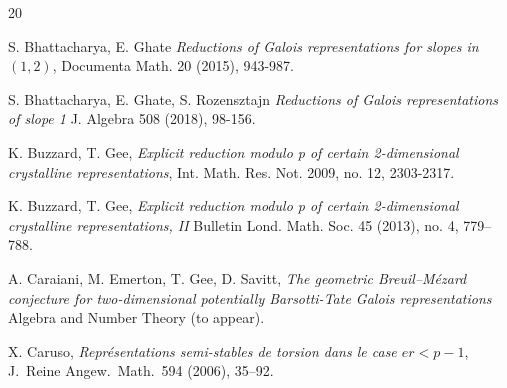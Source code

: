\documentclass[11pt]{amsart}
\theoremstyle{definition}
\numberwithin{equation}{subsection}
\theoremstyle{plain}
\theoremstyle{plain}
\theoremstyle{plain}
\theoremstyle{plain}
\theoremstyle{plain}
\theoremstyle{plain}
\theoremstyle{plain}
\theoremstyle{plain}
\theoremstyle{plain}
\theoremstyle{plain}
\theoremstyle{plain}
\theoremstyle{plain}
\theoremstyle{definition}
\theoremstyle{definition}
\theoremstyle{definition}
\theoremstyle{remark}
\renewcommand{\(}{\textup{(}}
\renewcommand{\)}{\textup{)}}
\newcommand{\Q}{\mathbf{Q}}
\begin{document}
\begin{thebibliography}{20}




 S. Bhattacharya, E. Ghate \emph{Reductions of Galois representations for slopes in $(1,2)$}, Documenta Math. 20 (2015), 943-987.

 S. Bhattacharya, E. Ghate, S. Rozensztajn \emph{Reductions of Galois representations of slope 1} J. Algebra 508 (2018), 98-156.






 K. Buzzard, T. Gee, \emph{Explicit reduction modulo p of certain 2-dimensional crystalline representations}, Int. Math. Res. Not. 2009, no. 12, 2303-2317.

 K. Buzzard, T. Gee, \emph{Explicit reduction modulo p of certain 2-dimensional crystalline representations, II} Bulletin Lond. Math. Soc. 45 (2013), no. 4, 779–788.






 A. Caraiani, M. Emerton, T. Gee, D. Savitt, \emph{The geometric Breuil–Mézard conjecture for two-dimensional potentially Barsotti-Tate Galois representations} Algebra and Number Theory (to appear).

 X. Caruso, \emph{Repr\'esentations semi-stables de torsion dans le case {$er<p-1$}}, J.~Reine Angew.~Math.~594 (2006), 35--92.


\end{thebibliography}
\end{document}
